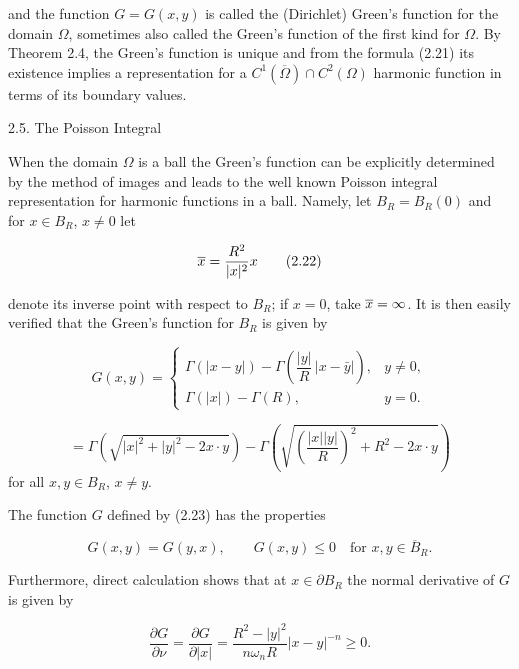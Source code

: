 and the function $G=G(x,y)$ is called the (Dirichlet) Green's function for the domain $\Omega$, sometimes also called the Green's function of the first kind for $\Omega$. By Theorem 2.4, the Green's function is unique and from the formula (2.21) its existence implies a representation for a $C^1(\overline{\Omega})\cap C^2(\Omega)$ harmonic function in terms of its boundary values.

2.5. The Poisson Integral

When the domain $\Omega$ is a ball the Green's function can be explicitly determined by the method of images and leads to the well known Poisson integral representation for harmonic functions in a ball. Namely, let $B_R=B_R(0)$ and for $x\in B_R$, $x\neq 0$ let

\begin{equation}
\overline{x}=\frac{R^2}{|x|^2}x
\tag{2.22}
\end{equation}

denote its inverse point with respect to $B_R$; if $x=0$, take $\overline{x}=\infty$. It is then easily verified that the Green's function for $B_R$ is given by

\begin{equation}
G(x,y)=
\begin{cases}
\Gamma(|x-y|)-\Gamma\!\left(\dfrac{|y|}{R}\,|x-\bar{y}|\right), & y\neq 0,\\[1.25ex]
\Gamma(|x|)-\Gamma(R), & y=0.
\end{cases}
\tag{2.23}
\end{equation}

\[
=\Gamma\!\left(\sqrt{|x|^2+|y|^2-2x\cdot y}\right)-\Gamma\!\left(\sqrt{\left(\dfrac{|x||y|}{R}\right)^2+R^2-2x\cdot y}\right)
\]
for all $x,y\in B_R$, $x\neq y$.

The function $G$ defined by (2.23) has the properties

\begin{equation}
G(x,y)=G(y,x), \qquad G(x,y)\leq 0 \quad \text{for } x,y\in \overline{B}_R.
\tag{2.24}
\end{equation}





Furthermore, direct calculation shows that at $x \in \partial B_R$ the normal derivative of $G$ is given by

\begin{equation}
\frac{\partial G}{\partial \nu}=\frac{\partial G}{\partial |x|}=\frac{R^2-|y|^2}{n\omega_n R}|x-y|^{-n}\geq 0.
\tag{2.25}
\end{equation}

